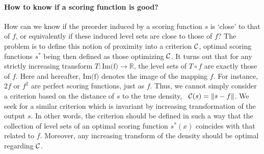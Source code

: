 
\paragraph{How to know if a scoring function is good?}
How can we know if the preorder induced by a scoring function $s$ is `close' to that of $f$, or equivalently if these induced level sets are close to those of $f$? 
%
The problem is to define this notion of proximity into a criterion $\mathcal{C}$, optimal scoring functions $s^*$ being then defined as those optimizing $\mathcal{C}$. 
It turns out that for any strictly increasing transform $T: \text{Im(f)} \to \mathbb{R} $, the level sets of $T\circ f$ are exactly those of $f$. Here and hereafter, $\text{Im(f)} $ denotes the image of the mapping $f$. For instance, $2f$ or $f^2$ are perfect scoring functions, just as $f$. Thus, we cannot simply consider a criterion based on the distance of $s$ to the true density, \eg~$\mathcal{C}(s)=\|s - f\|$.
We seek for a similar criterion which is invariant by increasing transformation of the output $s$. In other words, the criterion should be defined in such a way that the collection of level sets of an optimal scoring function $s^*(x)$ coincides with that related to $f$. Moreover, any increasing transform of the density should be optimal regarding $\mathcal{C}$.

